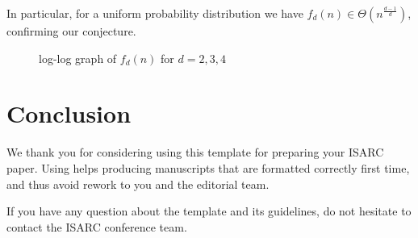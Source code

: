 \documentclass[a4paper, 10pt, twocolumn, twoside]{article}
\begin{document}
In particular, for a uniform probability distribution we have $f_d(n)\in \Theta(n^{\frac{d-1}{d}})$, confirming our conjecture.



\begin{figure}[htbp]
        \caption{log-log graph of $f_d(n)$ for $d=2,3,4$}
    \label{fig}
\end{figure}

\section{Conclusion}
\label{sec:Conclusion}

We thank you for considering using this  template for preparing your ISARC paper. 
Using  helps producing manuscripts that are formatted correctly first time, and thus avoid rework to you and the editorial team. 

If you have any question about the template and its guidelines, do not hesitate to contact the ISARC conference team.



\end{document}
